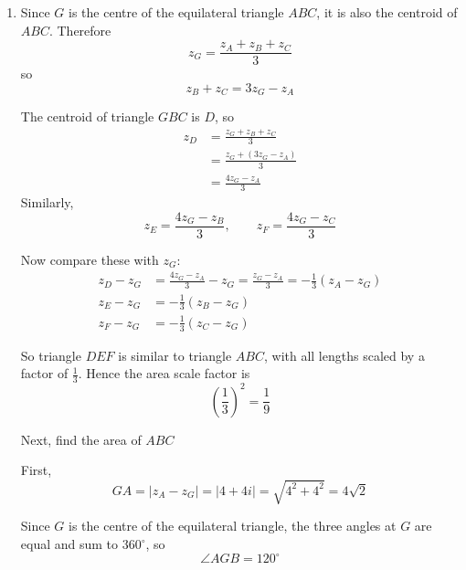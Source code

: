 \documentclass[leqno]{article}
\begin{document}
\begin{enumerate}[
  label=\textbf{\arabic*.},
  leftmargin=*,
  topsep=0pt,
  partopsep=0pt,
  parsep=0pt
]
\begin{tcolorbox}[colback=white, colframe=scarlet, title={\textbf{Solution}}, breakable, grow to left by=6mm, grow to right by=10mm]
\begin{enumerate}[label=\textbf{(\alph*)}]
  Now take \(C\) to be the \(-120^\circ\) rotation. Then
  \[
  z_C-z_G=(4+4i)\left(-\frac12-\frac{\sqrt3}{2}i\right)
  \]
  Expanding,
  \begin{align*}
  z_C-z_G
  &=4\left(-\frac12\right)+4\left(-\frac{\sqrt3}{2}i\right)+4i\left(-\frac12\right)+4i\left(-\frac{\sqrt3}{2}i\right) \\
  &=-2-2\sqrt3\,i-2i-2\sqrt3\,i^2 \\
  &=-2+2\sqrt3-(2+2\sqrt3)i
  \end{align*}
  Hence
  \begin{align*}
  z_C&=z_G+(z_C-z_G) \\
  &=(1-2i)+\bigl[-2+2\sqrt3-(2+2\sqrt3)i\bigr] \\
  &=-1+2\sqrt3-(4+2\sqrt3)i
  \end{align*}

  Therefore
  \[
  B=-1-2\sqrt3+(2\sqrt3-4)i,\qquad
  C=-1+2\sqrt3-(4+2\sqrt3)i
  \]
  with \(B\) and \(C\) interchangeable.

  \item Since \(G\) is the centre of the equilateral triangle \(ABC\), it is also the centroid of \(ABC\). Therefore
  \[
  z_G=\frac{z_A+z_B+z_C}{3}
  \]
  so
  \[
  z_B+z_C=3z_G-z_A
  \]

  The centroid of triangle \(GBC\) is \(D\), so
  \begin{align*}
  z_D&=\frac{z_G+z_B+z_C}{3} \\
  &=\frac{z_G+(3z_G-z_A)}{3} \\
  &=\frac{4z_G-z_A}{3}
  \end{align*}
  Similarly,
  \[
  z_E=\frac{4z_G-z_B}{3},\qquad z_F=\frac{4z_G-z_C}{3}
  \]

  Now compare these with \(z_G\):
  \begin{align*}
  z_D-z_G&=\frac{4z_G-z_A}{3}-z_G=\frac{z_G-z_A}{3}=-\frac13(z_A-z_G) \\
  z_E-z_G&=-\frac13(z_B-z_G) \\
  z_F-z_G&=-\frac13(z_C-z_G)
  \end{align*}

  So triangle \(DEF\) is similar to triangle \(ABC\), with all lengths scaled by a factor of \(\frac13\). Hence the area scale factor is
  \[
  \left(\frac13\right)^2=\frac19
  \]

  Next, find the area of \(ABC\)

  First,
  \[
  GA=|z_A-z_G|=|4+4i|=\sqrt{4^2+4^2}=4\sqrt2
  \]

  Since \(G\) is the centre of the equilateral triangle, the three angles at \(G\) are equal and sum to \(360^\circ\), so
  \[
  \angle AGB=120^\circ
  \]


\end{enumerate}
\end{tcolorbox}
\end{enumerate}
\end{document}
